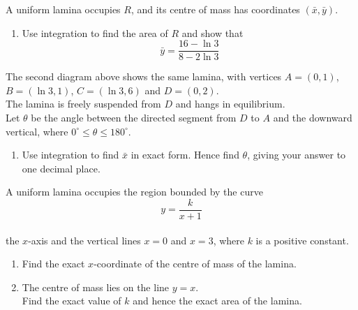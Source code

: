 \documentclass[leqno]{article}
\begin{document}
\begin{enumerate}[
  label=\textbf{\arabic*.},
  leftmargin=*,
  topsep=0pt,
  partopsep=0pt,
  parsep=0pt
]
A uniform lamina occupies $R$, and its centre of mass has coordinates $(\bar{x},\bar{y})$. \\
\begin{enumerate}[label=\textbf{(\alph*)}]
\item Use integration to find the area of $R$ and show that
\[
\bar{y}=\dfrac{16-\ln 3}{8-2\ln 3}
\] 
\end{enumerate}
The second diagram above shows the same lamina, with vertices $A=(0,1)$, $B=(\ln 3,1)$, $C=(\ln 3,6)$ and $D=(0,2)$. \\

The lamina is freely suspended from $D$ and hangs in equilibrium. \\
Let $\theta$ be the angle between the directed segment from $D$ to $A$ and the downward vertical, where $0^\circ\leq\theta\leq180^\circ$. \\
\begin{enumerate}[label=\textbf{(\alph*)}, resume]
\item Use integration to find $\bar{x}$ in exact form. Hence find $\theta$, giving your answer to one decimal place.  \\
\end{enumerate}

\newpage

\questionitem

A uniform lamina occupies the region bounded by the curve
\[
y=\dfrac{k}{x+1}
\] \\
the $x$-axis and the vertical lines $x=0$ and $x=3$, where $k$ is a positive constant. \\

\begin{enumerate}[label=\textbf{(\alph*)}]
  \item Find the exact $x$-coordinate of the centre of mass of the lamina.  \\
  \item The centre of mass lies on the line $y=x$. \\
  Find the exact value of $k$ and hence the exact area of the lamina.  \\
\end{enumerate}

\newpage

\questionitem


\end{enumerate}
\end{document}
